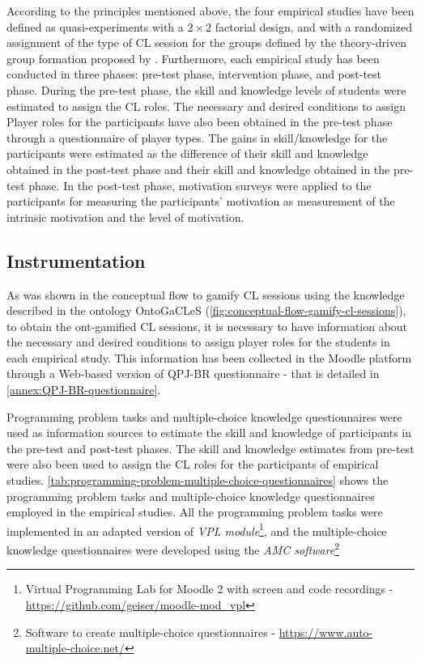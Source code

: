 According to the principles mentioned above, the four empirical studies have been defined as quasi-experiments with a $2\times2$ factorial design, and with a randomized assignment of the type of CL session for the groups defined by the theory-driven group formation proposed by . 
Furthermore, each empirical study has been conducted in three phases: pre-test phase, intervention phase, and post-test phase.
During the pre-test phase, the skill and knowledge levels of students were estimated to assign the CL roles.
The necessary and desired conditions to assign Player roles for the participants have also been obtained in the pre-test phase through a questionnaire of player types.
The gains in skill/knowledge for the participants were estimated as the difference of their skill and knowledge obtained in the post-test phase and their skill and knowledge obtained in the pre-test phase.
In the post-test phase, motivation surveys were applied to the participants for measuring the participants' motivation as measurement of the intrinsic motivation and the level of motivation.

\subsection{Instrumentation}
\label{subsec:instrumentation}

As was shown in the conceptual flow to gamify CL sessions using the knowledge described in the ontology OntoGaCLeS (\autoref{fig:conceptual-flow-gamify-cl-sessions}), to obtain the ont-gamified CL sessions, it is necessary to have information about the necessary and desired conditions to assign player roles for the students in each empirical study.
This information has been collected in the Moodle platform through a Web-based version of QPJ-BR questionnaire \cite{AndradeMarquesBittencourtIsotani2016} - that is detailed in \autoref{annex:QPJ-BR-questionnaire}.

Programming problem tasks and multiple-choice knowledge questionnaires were used as information sources to estimate the skill and knowledge of participants in the pre-test and post-test phases.
The skill and knowledge estimates from pre-test were also been used to assign the CL roles for the participants of empirical studies.
\autoref{tab:programming-problem-multiple-choice-questionnaires} shows the programming problem tasks and multiple-choice knowledge questionnaires employed in the empirical studies.
All the programming problem tasks were implemented in an adapted version of \emph{VPL module}\footnote{Virtual Programming Lab for Moodle 2 with screen and code recordings - \url{https://github.com/geiser/moodle-mod_vpl}}, and the multiple-choice knowledge questionnaires were developed using the \emph{AMC software}\footnote{Software to create multiple-choice questionnaires - \url{https://www.auto-multiple-choice.net/}}


